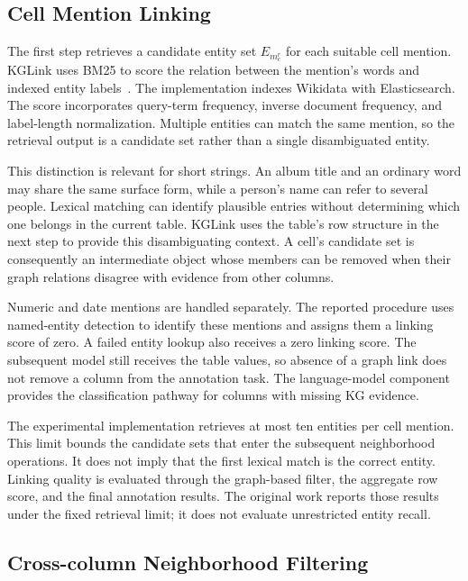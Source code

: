 \subsection{Cell Mention Linking}
\label{sec:kglink:linking}

The first step retrieves a candidate entity set $E_{m_c^r}$ for each suitable cell mention. KGLink uses BM25 to score the relation between the mention's words and indexed entity labels~\cite{kglink-robertson2009probabilistic}. The implementation indexes Wikidata with Elasticsearch. The score incorporates query-term frequency, inverse document frequency, and label-length normalization. Multiple entities can match the same mention, so the retrieval output is a candidate set rather than a single disambiguated entity.

This distinction is relevant for short strings. An album title and an ordinary word may share the same surface form, while a person's name can refer to several people. Lexical matching can identify plausible entries without determining which one belongs in the current table. KGLink uses the table's row structure in the next step to provide this disambiguating context. A cell's candidate set is consequently an intermediate object whose members can be removed when their graph relations disagree with evidence from other columns.

Numeric and date mentions are handled separately. The reported procedure uses named-entity detection to identify these mentions and assigns them a linking score of zero. A failed entity lookup also receives a zero linking score. The subsequent model still receives the table values, so absence of a graph link does not remove a column from the annotation task. The language-model component provides the classification pathway for columns with missing KG evidence.

The experimental implementation retrieves at most ten entities per cell mention. This limit bounds the candidate sets that enter the subsequent neighborhood operations. It does not imply that the first lexical match is the correct entity. Linking quality is evaluated through the graph-based filter, the aggregate row score, and the final annotation results. The original work reports those results under the fixed retrieval limit; it does not evaluate unrestricted entity recall.

\subsection{Cross-column Neighborhood Filtering}
\label{sec:kglink:filtering}

